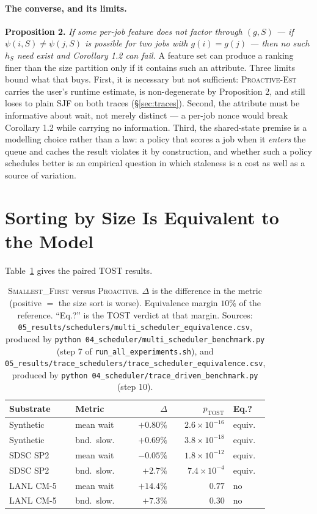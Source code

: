 \documentclass[11pt,twocolumn]{article}
\begin{document}
\paragraph{The converse, and its limits.}
\textbf{Proposition 2.} \emph{If some per-job feature does not factor through
$(g,S)$ --- if $\psi(i,S)\neq\psi(j,S)$ is possible for two jobs with $g(i)=g(j)$ ---
then no such $h_S$ need exist and Corollary 1.2 can fail.} A feature set can produce
a ranking finer than the size partition only if it contains such an attribute. Three
limits bound what that buys. First, it is necessary but not sufficient:
\textsc{Proactive-Est} carries the user's runtime estimate, is non-degenerate by
Proposition 2, and still loses to plain SJF on both traces
(\S\ref{sec:traces}). Second, the attribute must be informative about wait, not
merely distinct --- a per-job nonce would break Corollary 1.2 while carrying no
information. Third, the shared-state premise is a modelling choice rather than a law:
a policy that scores a job when it \emph{enters} the queue and caches the result
violates it by construction, and whether such a policy schedules better is an
empirical question in which staleness is a cost as well as a source of variation.

\section{Sorting by Size Is Equivalent to the Model}
\label{sec:equivalence}

Table~\ref{tab:equiv} gives the paired TOST results.

\begin{table}[h]
\centering
\footnotesize
\setlength{\tabcolsep}{4pt}
\begin{tabular}{llrrl}
\toprule
Substrate & Metric & $\Delta$ & $p_{\mathrm{TOST}}$ & Eq.? \\
\midrule
Synthetic & mean wait & $+0.80\%$ & $2.6\times10^{-16}$ & equiv. \\
Synthetic & bnd.\ slow. & $+0.69\%$ & $3.8\times10^{-18}$ & equiv. \\
SDSC SP2  & mean wait & $-0.05\%$ & $1.8\times10^{-12}$ & equiv. \\
SDSC SP2  & bnd.\ slow. & $+2.7\%$ & $7.4\times10^{-4}$ & equiv. \\
LANL CM-5 & mean wait & $+14.4\%$ & $0.77$ & no \\
LANL CM-5 & bnd.\ slow. & $+7.3\%$ & $0.30$ & no \\
\bottomrule
\end{tabular}
\caption{\textsc{Smallest\_First} versus \textsc{Proactive}. $\Delta$ is the
difference in the metric (positive $=$ the size sort is worse). Equivalence
margin $10\%$ of the reference. ``Eq.?'' is the TOST verdict at that margin.
{\small Sources: \texttt{05\_results/schedulers/multi\_scheduler\_equivalence.csv},
produced by \texttt{python 04\_scheduler/multi\_scheduler\_benchmark.py}
(step 7 of \texttt{run\_all\_experiments.sh}), and
\texttt{05\_results/trace\_schedulers/trace\_scheduler\_equivalence.csv},
produced by \texttt{python 04\_scheduler/trace\_driven\_benchmark.py}
(step 10).}}
\label{tab:equiv}
\end{table}
\end{document}
